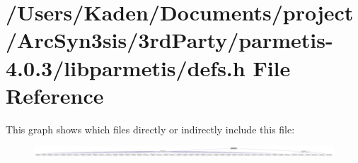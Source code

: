 \hypertarget{a00894}{}\section{/\+Users/\+Kaden/\+Documents/project/\+Arc\+Syn3sis/3rd\+Party/parmetis-\/4.0.3/libparmetis/defs.h File Reference}
\label{a00894}
This graph shows which files directly or indirectly include this file\+:\nopagebreak
\begin{figure}[H]
\begin{center}
\leavevmode
\includegraphics[width=350pt]{a00896}
\end{center}
\end{figure}
